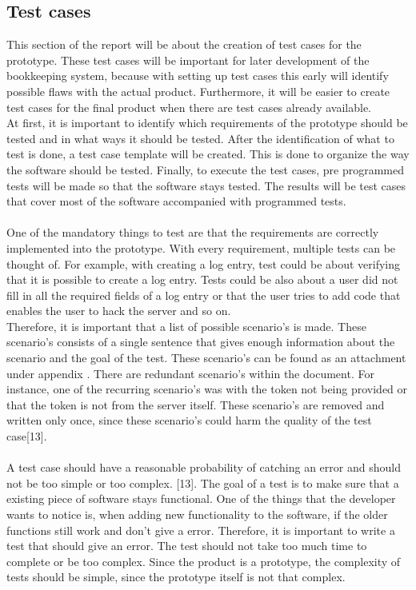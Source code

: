 \documentclass[paper=a4, fontsize=11pt,twoside]{scrartcl}	%
\begin{document}
\newpage
\subsection{Test cases}
This section of the report will be about the creation of test cases for the prototype. These test cases will be important for later development of the bookkeeping system, because with setting up test cases this early will identify possible flaws with the actual product.
Furthermore, it will be easier to create test cases for the final product when there are test cases already available. \\
At first, it is important to identify which requirements of the prototype should be tested and in what ways it should be tested. After the identification of what to test is done, a test case template will be created. This is done to organize the way the software should be tested. Finally, to execute the test cases, pre programmed tests will be made so that the software stays tested. The results will be test cases that cover most of the software accompanied with programmed tests. \\ \\
One of the mandatory things to test are that the requirements are correctly implemented into the prototype. With every requirement, multiple tests can be thought of. For example, with creating a log entry, test could be about verifying that it is possible to create a log entry. Tests could be also about a user did not fill in all the required fields of a log entry or that the user tries to add code that enables the user to hack the server and so on.  \\
Therefore, it is important that a list of possible scenario's is made. These scenario's consists of a single sentence that gives enough information about the scenario and the goal of the test. These scenario's can be found as an attachment under appendix . There are redundant scenario's within the document. For instance, one of the recurring scenario's was with the token not being provided or that the token is not from the server itself. These scenario's are removed and written only once, since these scenario's could harm the quality of the test case[13]. \\ \\
A test case should have a reasonable probability of catching an error and should not be too simple or too complex. [13]. The goal of a test is to make sure that a existing piece of software stays functional. One of the things that the developer wants to notice is, when adding new functionality to the software, if the older functions still work and don't give a error. Therefore, it is important to write a test  that should give an error. The test should not take too much time to complete or be too complex. Since the product is a prototype, the complexity of tests should be simple, since the prototype itself is not that complex. \\ 
\end{document}
